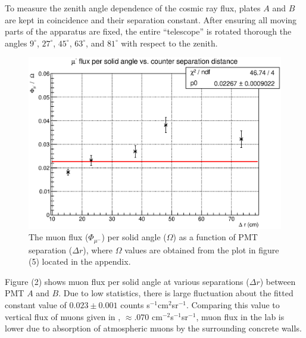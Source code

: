 \documentclass[11pt,twocolumn]{article}
\begin{document}
To measure the zenith angle dependence of the cosmic ray flux, plates $A$ and $B$ are kept in coincidence and their separation constant. After ensuring all moving parts of the apparatus are fixed, the entire ``telescope'' is rotated thorough the angles $9^{\circ}$, $27^{\circ}$, $45^{\circ}$, $63^{\circ}$, and $81^{\circ}$ with respect to the zenith. \cite{browder}

\begin{figure}[t]
\begin{center}
\includegraphics[scale=0.45]{flux_omega.eps}
\caption{The muon flux ($\Phi_{\mu^{-}}$) per solid angle ($\Omega$) as a function of PMT separation ($\Delta r$), where $\Omega$ values are obtained from the plot in figure (5) located in the appendix.}
\label{Alpha2}
\end{center}
\end{figure}

Figure (2) shows muon flux per solid angle at various separations ($\Delta r$) between PMT $A$ and $B$. Due to low statistics, there is large fluctuation about the fitted constant value of $0.023 \pm 0.001$ counts s$^{-1}$cm$^{2}$sr$^{-1}$. Comparing this value to vertical flux of muons given in \cite{pdg}, $\approx .070$ cm$^{-2}$s$^{-1}$sr$^{-1}$, muon flux in the lab is lower due to absorption of atmospheric muons by the surrounding concrete walls.
\end{document}
